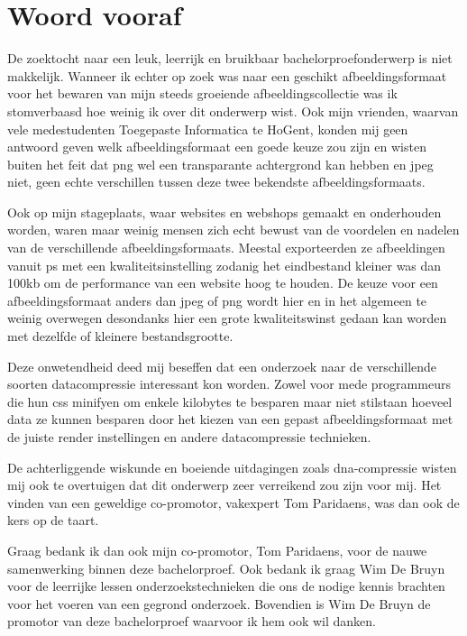 
\chapter*{Woord vooraf}
\label{ch:voorwoord}

De zoektocht naar een leuk, leerrijk en bruikbaar bachelorproefonderwerp is niet makkelijk. Wanneer ik echter op zoek was naar een geschikt \gls{afbeeldingsformaat} voor het bewaren van mijn steeds groeiende afbeeldingscollectie was ik stomverbaasd hoe weinig ik over dit onderwerp wist. Ook mijn vrienden, waarvan vele medestudenten Toegepaste Informatica te HoGent, konden mij geen antwoord geven welk \gls{afbeeldingsformaat} een goede keuze zou zijn en wisten buiten het feit dat \gls{png} wel een transparante achtergrond kan hebben en \gls{jpeg} niet, geen echte verschillen tussen deze twee bekendste \glspl{afbeeldingsformaat}.

Ook op mijn stageplaats, waar websites en webshops gemaakt en onderhouden worden, waren maar weinig mensen zich echt bewust van de voordelen en nadelen van de verschillende \glspl{afbeeldingsformaat}. Meestal exporteerden ze afbeeldingen vanuit \gls{ps} met een kwaliteitsinstelling zodanig het eindbestand kleiner was dan 100kb om de performance van een website hoog te houden. De keuze voor een \gls{afbeeldingsformaat} anders dan \gls{jpeg} of \gls{png} wordt hier en in het algemeen te weinig overwegen desondanks hier een grote kwaliteitswinst gedaan kan worden met dezelfde of kleinere bestandsgrootte. 

Deze onwetendheid deed mij beseffen dat een onderzoek naar de verschillende soorten \gls{datacompressie} interessant kon worden. Zowel voor mede programmeurs die hun \gls{css} \gls{minifyen} om enkele kilobytes te besparen maar niet stilstaan hoeveel data ze kunnen besparen door het kiezen van een gepast \gls{afbeeldingsformaat} met de juiste \gls{render} instellingen en andere \gls{datacompressie} technieken. 

De achterliggende wiskunde en boeiende uitdagingen zoals \gls{dna-compressie} wisten mij ook te overtuigen dat dit onderwerp zeer verreikend zou zijn voor mij. Het vinden van een geweldige co-promotor, vakexpert Tom Paridaens, was dan ook de kers op de taart.

\pagebreak

Graag bedank ik dan ook mijn co-promotor, Tom Paridaens, voor de nauwe samenwerking binnen deze bachelorproef. Ook bedank ik graag Wim De Bruyn voor de leerrijke lessen onderzoekstechnieken die ons de nodige kennis brachten voor het voeren van een gegrond onderzoek. Bovendien is Wim De Bruyn de promotor van deze bachelorproef waarvoor ik hem ook wil danken.

